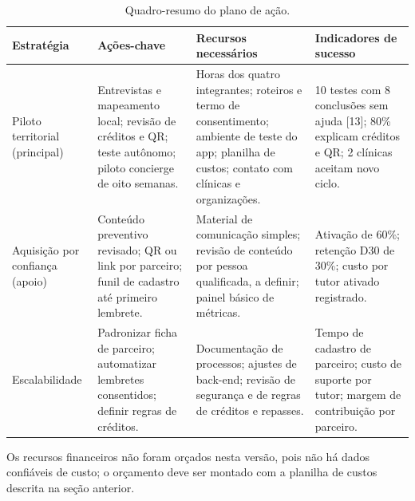 \documentclass[12pt,a4paper]{article}
\begin{document}
\begin{table}[H]
\centering
\small
\caption{Quadro-resumo do plano de ação.}
\begin{tabularx}{\textwidth}{P{2.7cm}YYY}
\toprule
\textbf{Estratégia} & \textbf{Ações-chave} & \textbf{Recursos necessários} & \textbf{Indicadores de sucesso} \\
\midrule
Piloto territorial (principal) & Entrevistas e mapeamento local; revisão de créditos e QR; teste autônomo; piloto concierge de oito semanas. & Horas dos quatro integrantes; roteiros e termo de consentimento; ambiente de teste do app; planilha de custos; contato com clínicas e organizações. & 10 testes com 8 conclusões sem ajuda [13]; 80\% explicam créditos e QR; 2 clínicas aceitam novo ciclo. \\
Aquisição por confiança (apoio) & Conteúdo preventivo revisado; QR ou link por parceiro; funil de cadastro até primeiro lembrete. & Material de comunicação simples; revisão de conteúdo por pessoa qualificada, a definir; painel básico de métricas. & Ativação de 60\%; retenção D30 de 30\%; custo por tutor ativado registrado. \\
Escalabilidade & Padronizar ficha de parceiro; automatizar lembretes consentidos; definir regras de créditos. & Documentação de processos; ajustes de back-end; revisão de segurança e de regras de créditos e repasses. & Tempo de cadastro de parceiro; custo de suporte por tutor; margem de contribuição por parceiro. \\
\bottomrule
\end{tabularx}
\end{table}

Os recursos financeiros não foram orçados nesta versão, pois não há dados confiáveis de custo; o orçamento deve ser montado com a planilha de custos descrita na seção anterior.
\end{document}
